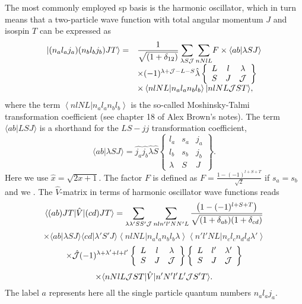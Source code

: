 The most commonly employed sp basis is the harmonic oscillator, which
in turn means that
a two-particle wave function with total angular momentum $J$
and isospin $T$
can be expressed as 
\[
\begin{array}{ll}
|(n_{a}l_{a}j_{a})(n_{b}l_{b}j_{b})JT\rangle=&
{\displaystyle
\frac{1}{\sqrt{(1+\delta_{12})}}
\sum_{\lambda S{\cal J}}\sum_{nNlL}}
F\times \langle ab|\lambda SJ \rangle\\
&\times (-1)^{\lambda +{\cal J}-L-S}\hat{\lambda}
\left\{\begin{array}{ccc}L&l&\lambda\\S&J&{\cal J}
\end{array}\right\}\\
&\times \left\langle nlNL| n_al_an_bl_b\right\rangle
|nlNL{\cal J}ST\rangle,\end{array}\label{eq:hoho}
\]
where the term
$\left\langle nlNL| n_al_an_bl_b\right\rangle$
is the so-called Moshinsky-Talmi transformation coefficient (see chapter 18 of Alex Brown's notes).
The term $\langle ab|LSJ \rangle $ is a shorthand
for the $LS-jj$ transformation coefficient,
\[
     \langle ab|\lambda SJ \rangle = \hat{j_{a}}\hat{j_{b}}
     \hat{\lambda}\hat{S}
     \left\{
    \begin{array}{ccc}
       l_{a}&s_a&j_{a}\\
       l_{b}&s_b&j_{b}\\
       \lambda    &S          &J
    \end{array}
    \right\}.\label{eq:lstrans}
\]
Here
we use $\hat{x} = \sqrt{2x +1}$.
The factor $F$ is defined as $F=\frac{1-(-1)^{l+S+T}}{\sqrt{2}}$ if
$s_a = s_b$ and we .
The $\hat{V}$-matrix in terms of harmonic oscillator wave functions reads
\[
  \langle (ab)JT |\hat{V}|(cd)JT\rangle=
  {\displaystyle \sum_{\lambda \lambda ' SS' {\cal J}}\sum_{nln'l'NN'L}
  \frac{\left(1-(-1)^{l+S+T}\right)}{\sqrt{(1+\delta_{ab})
  (1+\delta_{cd})}}}
\]
\[
  \times\langle ab|\lambda SJ\rangle \langle cd|\lambda 'S'J\rangle
  \left\langle nlNL| n_{a}l_{a}n_{b}l_{b}\lambda\right\rangle
  \left\langle n'l'NL| n_{c}l_{c}n_{d}l_{d}\lambda ' \right\rangle
\]
\[
 \times \hat{{\cal J}}(-1)^{\lambda + \lambda ' +l +l'}
  \left\{\begin{array}{ccc}L&l&\lambda\\S&J&{\cal J}
  \end{array}\right\}
  \left\{\begin{array}{ccc}L&l'&\lambda '\\S&J&{\cal J}
  \end{array}\right\}
\]
\[
 \times\langle nNlL{\cal J}ST |\hat{V}|n'N'l'L'{\cal J}S'T\rangle.
\]
The label $a$ represents here all the single particle quantum numbers  
$n_{a}l_{a}j_{a}$.


